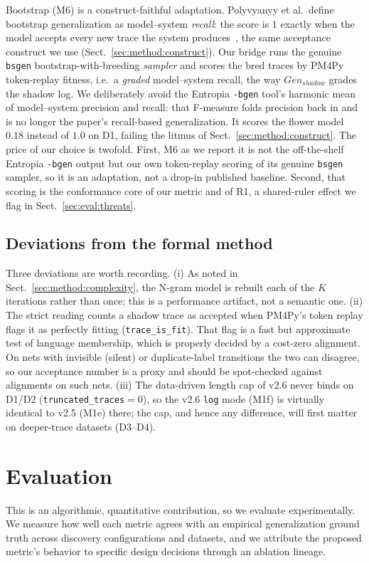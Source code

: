 \documentclass[runningheads]{llncs}
\newcommand{\genshadow}{\ensuremath{\mathit{Gen}_{\mathit{shadow}}}}
\begin{document}
Bootstrap (M6) is a construct-faithful adaptation. Polyvyanyy et al.\ define bootstrap generalization as model--system \emph{recall}: the score is $1$ exactly when the model accepts every new trace the system produces~\cite{polyvyanyy2022bootstrap}, the same acceptance construct we use (Sect.~\ref{sec:method:construct}). Our bridge runs the genuine \texttt{bsgen} bootstrap-with-breeding \emph{sampler} and scores the bred traces by PM4Py token-replay fitness, i.e.\ a \emph{graded} model--system recall, the way \genshadow{} grades the shadow log. We deliberately avoid the Entropia \texttt{-bgen} tool's harmonic mean of model--system precision and recall: that F-measure folds precision back in and is no longer the paper's recall-based generalization. It scores the flower model $0.18$ instead of $1.0$ on D1, failing the litmus of Sect.~\ref{sec:method:construct}. The price of our choice is twofold. First, M6 as we report it is not the off-the-shelf Entropia \texttt{-bgen} output but our own token-replay scoring of its genuine \texttt{bsgen} sampler, so it is an adaptation, not a drop-in published baseline. Second, that scoring is the conformance core of our metric and of R1, a shared-ruler effect we flag in Sect.~\ref{sec:eval:threats}.

\subsection{Deviations from the formal method}
\label{sec:impl:deviations}
Three deviations are worth recording. (i) As noted in Sect.~\ref{sec:method:complexity}, the N-gram model is rebuilt each of the $K$ iterations rather than once; this is a performance artifact, not a semantic one. (ii) The strict reading counts a shadow trace as accepted when PM4Py's token replay flags it as perfectly fitting (\texttt{trace\_is\_fit}). That flag is a fast but approximate test of language membership, which is properly decided by a cost-zero alignment. On nets with invisible (silent) or duplicate-label transitions the two can disagree, so our acceptance number is a proxy and should be spot-checked against alignments on such nets. (iii) The data-driven length cap of v2.6 never binds on D1/D2 (\texttt{truncated\_traces}${=}0$), so the v2.6 \texttt{log} mode (M1f) is virtually identical to v2.5 (M1e) there; the cap, and hence any difference, will first matter on deeper-trace datasets (D3--D4).

\section{Evaluation}
\label{sec:eval}
This is an algorithmic, quantitative contribution, so we evaluate experimentally. We measure how well each metric agrees with an empirical generalization ground truth across discovery configurations and datasets, and we attribute the proposed metric's behavior to specific design decisions through an ablation lineage.
\end{document}
